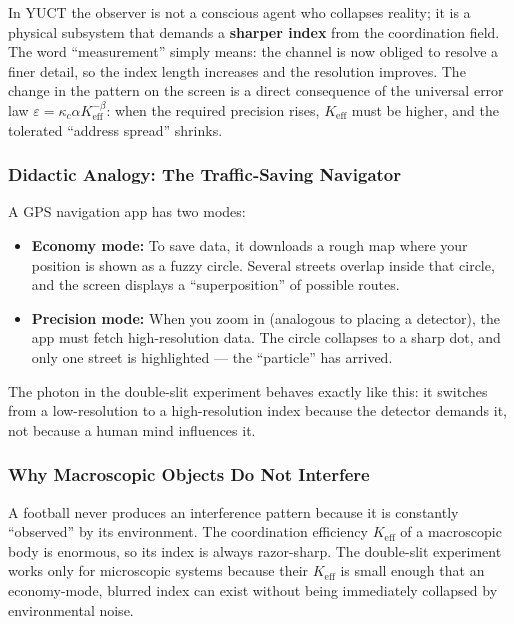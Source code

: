 \documentclass[12pt,a4paper]{article}
\theoremstyle{remark}
\begin{document}
	In YUCT the observer is not a conscious agent who collapses
	reality; it is a physical subsystem that demands a \textbf{sharper
		index} from the coordination field.  The word ``measurement''
	simply means: the channel is now obliged to resolve a finer detail,
	so the index length increases and the resolution improves.  The
	change in the pattern on the screen is a direct consequence of the
	universal error law $\varepsilon = \kappa_c \alpha K_{\mathrm{eff}}^{-\beta}$: when the required precision rises,
	$K_{\mathrm{eff}}$ must be higher, and the tolerated
	``address spread'' shrinks.
	
	\subsubsection{Didactic Analogy: The Traffic-Saving Navigator}
	
	A GPS navigation app has two modes:
	\begin{itemize}
		\item \textbf{Economy mode:} To save data, it downloads a
		rough map where your position is shown as a fuzzy circle.
		Several streets overlap inside that circle, and the screen
		displays a ``superposition'' of possible routes.
		\item \textbf{Precision mode:} When you zoom in (analogous to
		placing a detector), the app must fetch high-resolution data.
		The circle collapses to a sharp dot, and only one street is
		highlighted --- the ``particle'' has arrived.
	\end{itemize}
	The photon in the double-slit experiment behaves exactly like
	this: it switches from a low-resolution to a high-resolution index
	because the detector demands it, not because a human mind
	influences it.
	
	\subsubsection{Why Macroscopic Objects Do Not Interfere}
	
	A football never produces an interference pattern because it is
	constantly ``observed'' by its environment.  The coordination
	efficiency $K_{\mathrm{eff}}$ of a macroscopic body is enormous,
	so its index is always razor-sharp.  The double-slit experiment
	works only for microscopic systems because their $K_{\mathrm{eff}}$
	is small enough that an economy-mode, blurred index can exist
	without being immediately collapsed by environmental noise.
	
\end{document}
